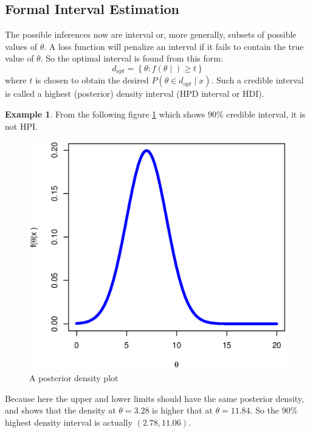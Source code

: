 \documentclass[lecture,12pt,]{pcms-l}
\numberwithin{section}{chapter}
\numberwithin{equation}{chapter}
\theoremstyle{plain}
\theoremstyle{definition}
\newtheorem{example}{Example}[section]
\theoremstyle{definition}
\begin{document}
\subsection{Formal Interval Estimation}
The possible inferences now are interval or, more generally, subsets of possible values of $\theta$. A loss function will penalize an interval if it fails to contain the true value of $\theta$. So the optimal interval is found from this form:
\begin{equation}
\boxed{d_{opt}=\left \{ \theta: f(\theta \mid) \geq t \right \}}
\end{equation}
where $t$ is chosen to obtain the desired $P(\theta \in d_{opt} \mid x)$. Such a credible interval is called a highest (posterior) density interval (HPD interval or HDI).
\begin{example}
From the following figure \ref{fig:credible} which shows $90 \%$ credible interval, it is not HPI.
\begin{figure}[h!]
 \includegraphics[scale=0.5]{Credible}%
  \caption{A posterior density plot}
\label{fig:credible}
\end{figure}
Because here the upper and lower limits should have the same posterior density, and shows that the density at $\theta = 3.28$ is higher that at $\theta = 11.84$. So the $90 \%$ highest density interval is actually $(2.78,11.06)$.
\end{example}
\end{document}
